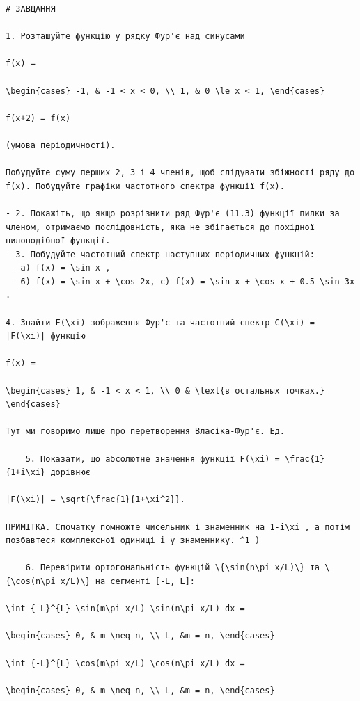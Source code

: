 \documentclass[
  ukrainian,
]{article}
\begin{document}
\begin{verbatim}
# ЗАВДАННЯ

1. Розташуйте функцію у рядку Фур'є над синусами

f(x) =

\begin{cases} -1, & -1 < x < 0, \\ 1, & 0 \le x < 1, \end{cases}

f(x+2) = f(x)

(умова періодичності).

Побудуйте суму перших 2, 3 і 4 членів, щоб слідувати збіжності ряду до f(x). Побудуйте графіки частотного спектра функції f(x).

- 2. Покажіть, що якщо розрізнити ряд Фур'є (11.3) функції пилки за членом, отримаємо послідовність, яка не збігається до похідної пилоподібної функції.
- 3. Побудуйте частотний спектр наступних періодичних функцій:
 - a) f(x) = \sin x ,
 - 6) f(x) = \sin x + \cos 2x, c) f(x) = \sin x + \cos x + 0.5 \sin 3x .

4. Знайти F(\xi) зображення Фур'є та частотний спектр C(\xi) = |F(\xi)| функцію

f(x) =

\begin{cases} 1, & -1 < x < 1, \\ 0 & \text{в остальных точках.} \end{cases}

Тут ми говоримо лише про перетворення Власіка-Фур'є. Ед.

    5. Показати, що абсолютне значення функції F(\xi) = \frac{1}{1+i\xi} дорівнює

|F(\xi)| = \sqrt{\frac{1}{1+\xi^2}}.

ПРИМІТКА. Спочатку помножте чисельник і знаменник на 1-i\xi , а потім позбавтеся комплексної одиниці i у знаменнику. ^1 )

    6. Перевірити ортогональність функцій \{\sin(n\pi x/L)\} та \{\cos(n\pi x/L)\} на сегменті [-L, L]:

\int_{-L}^{L} \sin(m\pi x/L) \sin(n\pi x/L) dx =

\begin{cases} 0, & m \neq n, \\ L, &m = n, \end{cases}

\int_{-L}^{L} \cos(m\pi x/L) \cos(n\pi x/L) dx =

\begin{cases} 0, & m \neq n, \\ L, &m = n, \end{cases}


\end{verbatim}
\end{document}
